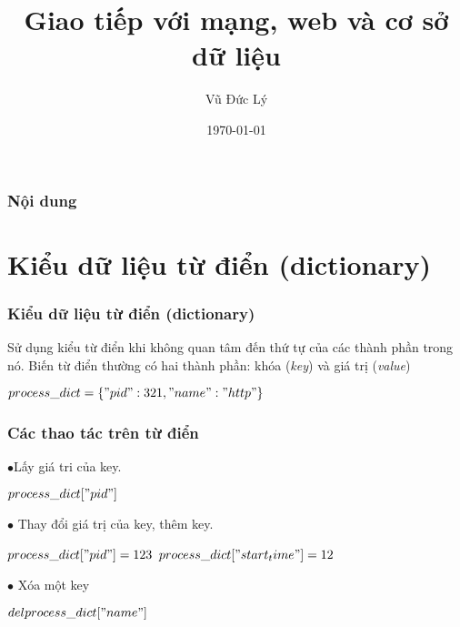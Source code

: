 \documentclass{beamer}
\title[Giao tiếp với mạng và cơ sở dữ liệu ]{Giao tiếp với mạng, web và cơ sở dữ liệu } %
\author{Vũ Đức Lý} %
\date{\today} %
\begin{document}
\begin{frame}
\titlepage %
\hyperlink{intro}{}
\end{frame}

\begin{frame}[label=intro]
\frametitle{Nội dung} %
\tableofcontents %
\end{frame}


\section{Kiểu dữ liệu từ điển (dictionary)} 
\begin{frame}[label=dict]
\frametitle{Kiểu dữ liệu từ điển (dictionary)}
Sử dụng kiểu từ điển khi không quan tâm đến thứ tự của các thành phần trong nó. Biến từ điển thường có hai thành phần: khóa (\textit{key}) và giá trị (\textit{value})

\begin{example}
$process\_dict = \{"pid": 321, "name": "http"\}$
\end{example} 
\hyperlink{intro}{}
\hyperlink{moitruong}{}
\end{frame}

\begin{frame}[label=dictoper]
\frametitle{Các thao tác trên từ điển}
$\bullet$Lấy giá tri của key. 
\begin{example}
$process\_dict["pid"]$
\end{example}
$\bullet$ Thay đổi giá trị của key, thêm key.
\begin{example}
$process\_dict["pid"] = 123$ 
$process\_dict["start_time"] = 12$
\end{example}
$\bullet$ Xóa một key
\begin{example}
$del  process\_dict["name"]$
\end{example}
\hyperlink{teptin}{}
\end{frame}
\end{document}
